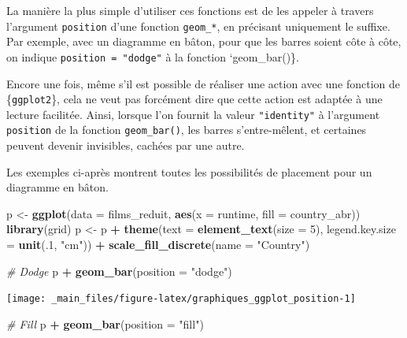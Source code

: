 \documentclass[
  11pt,
]{book}
\newenvironment{Shaded}{\begin{snugshade}}{\end{snugshade}}
\newcommand{\CommentTok}[1]{\textcolor[rgb]{0.56,0.35,0.01}{\textit{#1}}}
\newcommand{\DataTypeTok}[1]{\textcolor[rgb]{0.13,0.29,0.53}{#1}}
\newcommand{\DecValTok}[1]{\textcolor[rgb]{0.00,0.00,0.81}{#1}}
\newcommand{\KeywordTok}[1]{\textcolor[rgb]{0.13,0.29,0.53}{\textbf{#1}}}
\newcommand{\NormalTok}[1]{#1}
\newcommand{\OperatorTok}[1]{\textcolor[rgb]{0.81,0.36,0.00}{\textbf{#1}}}
\newcommand{\StringTok}[1]{\textcolor[rgb]{0.31,0.60,0.02}{#1}}
\numberwithin{equation}{section}
\numberwithin{countremarque}{section}
\begin{document}
La manière la plus simple d'utiliser ces fonctions est de les appeler à travers l'argument \texttt{position} d'une fonction \texttt{geom\_*}, en précisant uniquement le suffixe. Par exemple, avec un diagramme en bâton, pour que les barres soient côte à côte, on indique \texttt{position\ =\ "dodge"} à la fonction `geom\_bar()\}.

Encore une fois, même s'il est possible de réaliser une action avec une fonction de \{\texttt{ggplot2}\}, cela ne veut pas forcément dire que cette action est adaptée à une lecture facilitée. Ainsi, lorsque l'on fournit la valeur \texttt{"identity"} à l'argument \texttt{position} de la fonction \texttt{geom\_bar()}, les barres s'entre-mêlent, et certaines peuvent devenir invisibles, cachées par une autre.

Les exemples ci-après montrent toutes les possibilités de placement pour un diagramme en bâton.

\begin{Shaded}
\begin{Highlighting}[]
\NormalTok{p \textless{}{-}}\StringTok{ }\KeywordTok{ggplot}\NormalTok{(}\DataTypeTok{data =}\NormalTok{ films\_reduit,}
            \KeywordTok{aes}\NormalTok{(}\DataTypeTok{x =}\NormalTok{ runtime, }\DataTypeTok{fill =}\NormalTok{ country\_abr))}
\KeywordTok{library}\NormalTok{(grid)}
\NormalTok{p \textless{}{-}}\StringTok{ }\NormalTok{p }\OperatorTok{+}\StringTok{ }
\StringTok{  }\KeywordTok{theme}\NormalTok{(}\DataTypeTok{text =} \KeywordTok{element\_text}\NormalTok{(}\DataTypeTok{size =} \DecValTok{5}\NormalTok{),}
        \DataTypeTok{legend.key.size =} \KeywordTok{unit}\NormalTok{(.}\DecValTok{1}\NormalTok{, }\StringTok{"cm"}\NormalTok{)) }\OperatorTok{+}\StringTok{ }
\StringTok{  }\KeywordTok{scale\_fill\_discrete}\NormalTok{(}\DataTypeTok{name =} \StringTok{"Country"}\NormalTok{)}

\CommentTok{\# Dodge}
\NormalTok{p }\OperatorTok{+}\StringTok{ }\KeywordTok{geom\_bar}\NormalTok{(}\DataTypeTok{position =} \StringTok{"dodge"}\NormalTok{)}
\end{Highlighting}
\end{Shaded}

\begin{center}\texttt{[image: \_main\_files/figure-latex/graphiques\_ggplot\_position-1]} \end{center}

\begin{Shaded}
\begin{Highlighting}[]
\CommentTok{\# Fill}
\NormalTok{p }\OperatorTok{+}\StringTok{ }\KeywordTok{geom\_bar}\NormalTok{(}\DataTypeTok{position =} \StringTok{"fill"}\NormalTok{)}
\end{Highlighting}
\end{Shaded}
\end{document}
